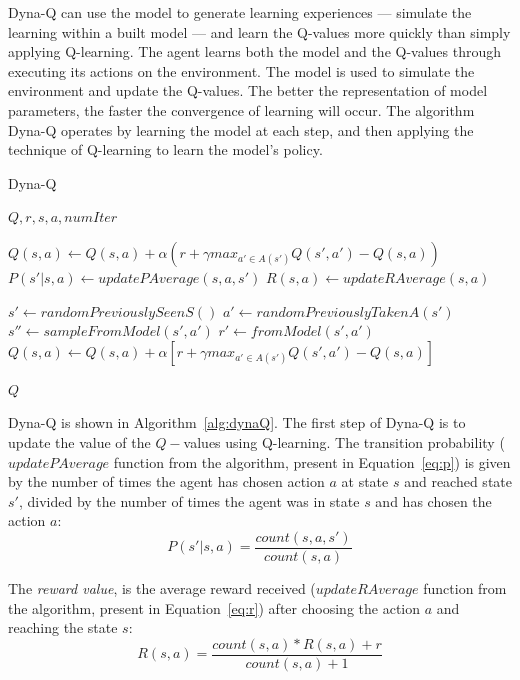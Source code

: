 Dyna-Q can use the model to generate learning experiences --- simulate the learning within a built model --- and learn the Q-values more quickly than simply applying Q-learning.
The agent learns both the model and the Q-values through executing its actions on the environment.
The model is used to simulate the environment and update the Q-values.
The better the representation of model parameters, the faster the convergence of learning will occur.
The algorithm Dyna-Q operates by learning the model at each step, and then applying the technique of Q-learning to learn the model's policy.

\begin{algorithm}
	\caption{Dyna-Q}
	\label{alg:dynaQ}
	\begin{algorithmic}[1]
		\REQUIRE $Q, r, s, a, numIter$
		\item[]
		\STATE $Q(s,a) \gets Q(s,a) + \alpha(r + \gamma max_{a' \in A(s')}Q(s',a') - Q(s,a))$
		\STATE $P(s'|s,a) \gets updatePAverage(s,a,s')$
		\STATE $R(s,a) \gets updateRAverage(s,a)$
		\item[]
        	\STATE $s' \gets randomPreviouslySeenS()$
        	\STATE $a' \gets randomPreviouslyTakenA(s')$
        	\STATE $s'' \gets sampleFromModel(s',a')$
        	\STATE $r' \gets fromModel(s',a')$
        	\STATE $Q(s,a) \leftarrow Q(s,a) + \alpha[r + \gamma max_{a' \in A(s')}Q(s',a') - Q(s,a)]$
		\ENDFOR
		\item[]
		\RETURN $Q$
	\end{algorithmic}
\end{algorithm}

Dyna-Q is shown in Algorithm~\ref{alg:dynaQ}. The first step of Dyna-Q is to update the value of the $Q-$values using Q-learning.
The transition probability ($updatePAverage$ function from the algorithm, present in Equation~\ref{eq:p}) is given by the number of times the agent has chosen action $a$ at state $s$ and reached state $s'$, divided by the number of times the agent was in state $s$ and has chosen the action $a$:
\begin{equation} \label{eq:p}
	P(s'|s,a) = \frac{count(s,a,s')}{count(s,a)}
\end{equation}

The \textit{reward value}, is the average reward received ($updateRAverage$ function from the algorithm, present in Equation~\ref{eq:r}) after choosing the action $a$ and reaching the state $s$:
\begin{equation} \label{eq:r}
	R(s,a) = \frac{count(s,a) * R(s,a) + r}{count(s,a) + 1}
\end{equation}

